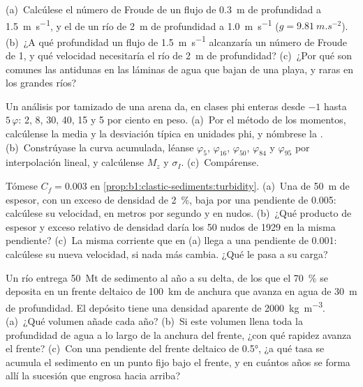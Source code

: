 \begin{exercise}[$\star\star$]\label{exo:b1:clastic-sediments:9}
(a)~Calcúlese el número de Froude de un flujo de \qty{0.3}{m} de profundidad a \qty{1.5}{m.s^{-1}}, y el de un río de \qty{2}{m} de profundidad a \qty{1.0}{m.s^{-1}}
($g
= \qty{9.81}{m.s^{-2}}$). (b)~¿A qué profundidad un flujo de \qty{1.5}{m.s^{-1}} alcanzaría un número de Froude de 1, y qué velocidad necesitaría el río de \qty{2}{m} de profundidad?
(c)~¿Por qué son comunes las antidunas en las láminas de agua que bajan de una playa, y raras en los grandes ríos?
\end{exercise}

\begin{exercise}[$\star\star\star$]\label{exo:b1:clastic-sediments:10}
Un análisis por tamizado de una arena da, en clases phi enteras desde $-1$ hasta $5\,\varphi$: 2, 8, 30, 40, 15 y 5 por ciento en peso. (a)~Por el método de los momentos,
calcúlense la media y la desviación típica en unidades phi, y nómbrese la . (b)~Constrúyase la curva acumulada, léanse $\varphi_5$, $\varphi_{16}$, $\varphi_{50}$, $\varphi_{84}$ y
$\varphi_{95}$ por interpolación lineal, y calcúlense $M_z$ y $\sigma_I$. (c)~Compárense.
\end{exercise}

\begin{exercise}[$\star\star\star$]\label{exo:b1:clastic-sediments:11}
Tómese $C_f = 0.003$ en \cref{prop:b1:clastic-sediments:turbidity}. (a)~Una  de \qty{50}{m} de espesor, con un exceso de densidad de
\qty{2}{\percent}, baja por una pendiente de \num{0.005}: calcúlese su velocidad, en metros por segundo y en nudos. (b)~¿Qué producto de espesor y exceso relativo de densidad
daría los 50 nudos de 1929 en la misma pendiente? (c)~La misma corriente que en (a) llega a una pendiente de \num{0.001}: calcúlese su nueva velocidad, si nada más cambia.
¿Qué le pasa a su carga?
\end{exercise}

\begin{exercise}[$\star\star\star$]\label{exo:b1:clastic-sediments:12}
Un río entrega \qty{50}{Mt} de sedimento al año a su delta, de los que el \qty{70}{\percent} se deposita en un frente deltaico de \qty{100}{km} de anchura que avanza en agua de
\qty{30}{m} de profundidad. El depósito tiene una densidad aparente de \qty{2000}{kg.m^{-3}}. (a)~¿Qué volumen añade cada año? (b)~Si este volumen llena toda la profundidad de agua a lo
largo de la anchura del frente, ¿con qué rapidez avanza el frente? (c)~Con una pendiente del frente deltaico de \ang{0.5}, ¿a qué tasa se acumula el sedimento en un punto fijo bajo el frente, y en
cuántos años se forma allí la sucesión que engrosa hacia arriba?
\end{exercise}

